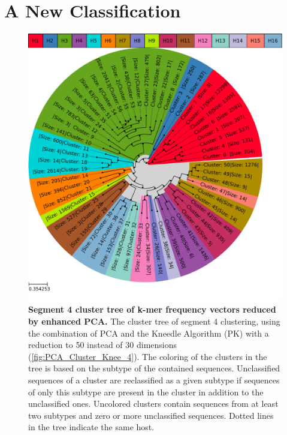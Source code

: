\section{A New Classification} \label{sec:Serotype_Classification}

\begin{figure}[!hbt]
    \centering
    \includegraphics[width=\textwidth]{Results/Clustertree_Segment_4.pdf}
    \caption[Segment 4 cluster tree of k-mer frequency vectors reduced by enhanced \Acrshort{PCA}]{\textbf{Segment 4 cluster tree of k-mer frequency vectors reduced by enhanced \Acrshort{PCA}.} The cluster tree of segment 4 clustering, using the combination of \gls{PCA} and the Kneedle Algorithm (PK) with a reduction to 50 instead of 30 dimensions (\autoref{fig:PCA_Cluster_Knee_4}). The coloring of the clusters in the tree is based on the subtype of the contained sequences. Unclassified sequences of a cluster are reclassified as a given subtype if sequences of only this subtype are present in the cluster in addition to the unclassified ones. Uncolored clusters contain sequences from at least two subtypes and zero or more unclassified sequences. Dotted lines in the tree indicate the same host.}
    \label{fig:Result_Clustertree_Segment_4}
\end{figure}

